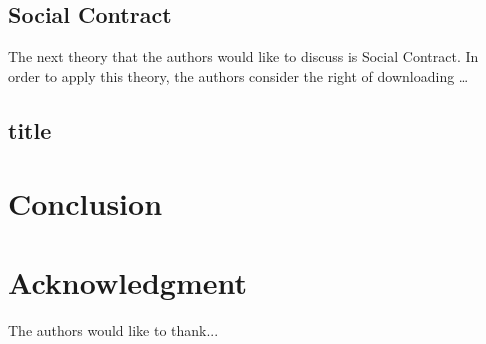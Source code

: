 \documentclass[conference]{IEEEtran}
\begin{document}
\subsection{Social Contract}
The next theory that the authors would like to discuss is Social Contract. In order to apply this theory, the authors consider the right of downloading … 


\subsection{title} 



\section{Conclusion} \label{conclusion}








\section*{Acknowledgment}


The authors would like to thank...







%
%
%







\end{document}
